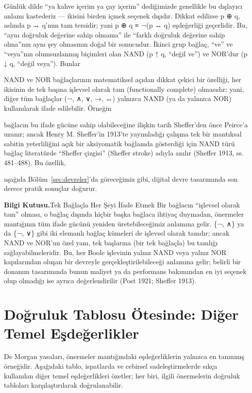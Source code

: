 Günlük dilde “ya kahve içerim ya çay içerim” dediğimizde genellikle bu dışlayıcı anlamı kastederiz — ikisini birden içmek seçenek dışıdır. Dikkat edilirse p ⊕ q, aslında p ↔ q’nun tam tersidir; yani p ⊕ q ≡ ¬(p ↔ q) eşdeğerliği geçerlidir. Bu, “aynı doğruluk değerine sahip olmama” ile “farklı doğruluk değerine sahip olma”nın aynı şey olmasının doğal bir sonucudur. İkinci grup bağlaç, “ve” ve “veya”nın olumsuzlanmış biçimleri olan NAND (p ↑ q, “değil ve”) ve NOR’dur (p ↓ q, “değil veya”). Bunlar

NAND ve NOR bağlaçlarının matematiksel açıdan dikkat çekici bir özelliği, her ikisinin de tek başına işlevsel olarak tam (functionally complete) olmasıdır: yani, diğer tüm bağlaçlar (¬, ∧, ∨, →, ↔) yalnızca NAND (ya da yalnızca NOR) kullanılarak ifade edilebilir. Örneğin

bağlacın bu ifade gücüne sahip olabileceğine ilişkin tarih Sheffer’den önce Peirce’a uzanır; ancak Henry M. Sheffer’in 1913’te yayımladığı çalışma tek bir mantıksal sabitin yeterliliğini açık bir aksiyomatik bağlamda gösterdiği için NAND türü bağlaç literatürde “Sheffer çizgisi” (Sheffer stroke) adıyla anılır (Sheffer 1913, ss. 481–488). Bu özellik,

aşağıda Bölüm~\ref{sec:devreler}’da göreceğimiz gibi, dijital devre tasarımında son derece pratik sonuçlar doğurur.

\begin{tcolorbox}[bookbox,colback=cEx]\textbf{\textsf{\textcolor{cAcc}{Bilgi Kutusu.}}}\quad Tek Bağlaçla Her Şeyi İfade Etmek Bir bağlacın “işlevsel olarak tam” olması, o bağlaç dışında hiçbir başka bağlaca ihtiyaç duymadan, önermeler mantığının tüm ifade gücünü yeniden üretebileceğimiz anlamına gelir. \{¬, ∧\} ya da \{¬, ∨\} gibi iki elemanlı bağlaç kümeleri de işlevsel olarak tamdır; ancak NAND ve NOR’un özel yanı, tek başlarına (bir tek bağlaçla) bu tamlığı sağlayabilmeleridir. Bu, her Boole işlevinin yalnız NAND veya yalnız NOR kapılarından oluşan bir devreyle gerçekleştirilebileceği anlamına gelir; belirli bir donanım tasarımında bunun maliyet ya da performans bakımından en iyi seçenek olup olmadığı ise ayrıca değerlendirilir (Post 1921; Sheffer 1913).\end{tcolorbox}

\section{Doğruluk Tablosu Ötesinde: Diğer Temel Eşdeğerlikler}

De Morgan yasaları, önermeler mantığındaki eşdeğerliklerin yalnızca en tanınmış örneğidir. Aşağıdaki tablo, ispatlarda ve cebirsel sadeleştirmelerde sıkça kullanılan diğer temel eşdeğerlikleri özetler; her biri, ilgili önermelerin doğruluk tabloları karşılaştırılarak doğrulanabilir.

